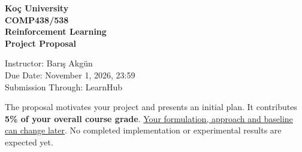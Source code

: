 \documentclass{article}
\newcommand{\instructor}{Bar{\i}\c{s} Akg\"un}
\begin{document}
\begin{center}
{\Large\bfseries Ko\c{c} University\\COMP438/538\\Reinforcement Learning\\Project Proposal\par}
\vspace{5pt}
Instructor: \instructor\\
Due Date: November 1, 2026, 23:59\\
Submission Through: LearnHub\\
\end{center}

The proposal motivates your project and presents an initial plan. It contributes \textbf{5\% of your overall course grade}. \underline{Your formulation, approach and baseline can change later}. No completed implementation or experimental results are expected yet.
\end{document}
